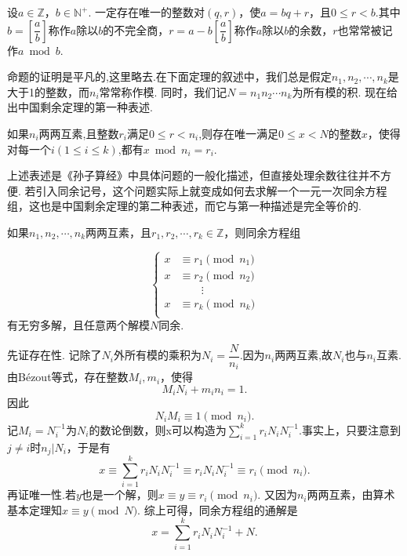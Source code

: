 \documentclass[color=green,mathpazo,titlestyle=hang]{elegantbook}
\begin{document}
  
\begin{newprop}[带余除法]
  设$a\in \mathbb{Z}$，$b\in \mathbb{N^+}$.	一定存在唯一的整数对$(q,r)$，使$a=bq+r$，且$0\leq r< b$.其中$b=\left[\dfrac{a}{b}\right]$称作$a$除以$b$的不完全商，$r=a-b\left[\dfrac{a}{b}\right]$称作$a$除以$b$的余数，$r$也常常被记作$a\bmod b$.
\end{newprop} 


\newpage

  命题的证明是平凡的,这里略去.在下面定理的叙述中，我们总是假定$n_1,n_2,\cdots,n_k$是大于1的整数，而$n_i$常常称作模. 同时，我们记$N=n_1n_2\cdots n_k$为所有模的积. 现在给出中国剩余定理的第一种表述.
  
  
  \begin{newthem}[中国剩余定理I]
  	如果$n_i$两两互素,且整数$r_i$满足$0\leq r< n_i$,则存在唯一满足$0\leq x <N$的整数$x$，使得对每一个$i(1\leq i \leq k)$,都有$x\bmod n_i=r_i$.
  \end{newthem}

  上述表述是《孙子算经》中具体问题的一般化描述，但直接处理余数往往并不方便. 若引入同余记号，这个问题实际上就变成如何去求解一个一元一次同余方程组，这也是中国剩余定理的第二种表述，而它与第一种描述是完全等价的.
  
  \begin{newthem}[中国剩余定理II]
  	如果$n_1,n_2,\cdots,n_k$两两互素，且$r_1,r_2,\cdots,r_k \in \mathbb{Z}$，则同余方程组
  
  	\begin{equation*}
  	\left\{                          
  	\begin{aligned}
  	x&\equiv r_1\pmod{n_1}\\
  	x&\equiv r_2\pmod{n_2}\\
  	 &\qquad \vdots\\ 
  	x&\equiv r_k\pmod{n_k}\\
  	\end{aligned}
  	\right.
  	\end{equation*}
  有无穷多解，且任意两个解模$N$同余.	
  
  \end{newthem}


  \begin{newproof}
	先证存在性. 记除了$N_i$外所有模的乘积为$N_i=\dfrac{N}{n_i}$.因为$n_i$两两互素,故$N_i$也与$n_i$互素.由B\'{e}zout等式，存在整数$M_i,m_i$，使得
	\[
	M_iN_i+m_in_i=1.
	\]
	因此
	\[
	N_iM_i\equiv 1\pmod{n_i}.
	\]
	记$M_i=N_i^{-1}$为$N_i$的数论倒数，则x可以构造为$\sum\limits_{i=1}^{k}r_iN_i N_i^{-1}$.事实上，只要注意到$j\ne i$时$n_j|N_i$，于是有
	\[
	x\equiv \sum_{i=1}^{k}r_iN_i N_i^{-1}\equiv r_iN_i N_i^{-1}\equiv r_i\pmod{n_i}.
	\]
	再证唯一性.若$y$也是一个解，则$x\equiv y\equiv r_i\pmod{n_i}$. 又因为$n_i$两两互素，由算术基本定理知$x\equiv y\pmod{N}$.
	综上可得，同余方程组的通解是
	\[
		x=\sum_{i=1}^{k}r_iN_i N_i^{-1}+N.
	\]
  \end{newproof}
\end{document}
